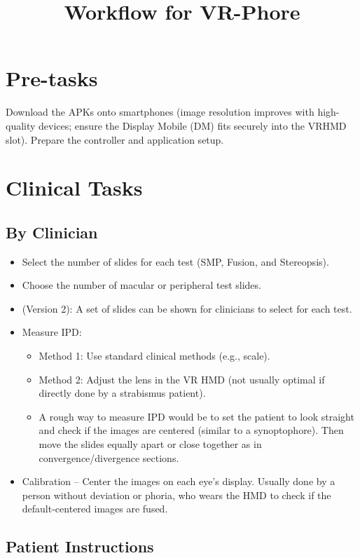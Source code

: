 \documentclass{article}
\title{Workflow for VR-Phore}
\author{}
\date{}
\begin{document}
\maketitle

\section{Pre-tasks}

Download the APKs onto smartphones (image resolution improves with high-quality devices; ensure the Display Mobile (DM) fits securely into the VRHMD slot). Prepare the controller and application setup.

\section{Clinical Tasks}

\subsection{By Clinician}

\begin{itemize}
\item Select the number of slides for each test (SMP, Fusion, and Stereopsis).
\item Choose the number of macular or peripheral test slides.
\item (Version 2): A set of slides can be shown for clinicians to select for each test.
\item Measure IPD:
    \begin{itemize}
        \item Method 1: Use standard clinical methods (e.g., scale).
        \item Method 2: Adjust the lens in the VR HMD (not usually optimal if directly done by a strabismus patient).
        \item A rough way to measure IPD would be to set the patient to look straight and check if the images are centered (similar to a synoptophore). Then move the slides equally apart or close together as in convergence/divergence sections.
    \end{itemize}
\item Calibration -- Center the images on each eye's display. Usually done by a person without deviation or phoria, who wears the HMD to check if the default-centered images are fused.
\end{itemize}

\subsection{Patient Instructions}
\end{document}

